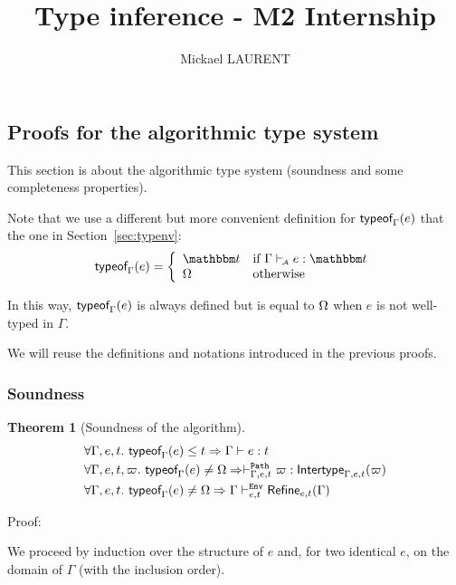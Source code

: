 \documentclass[a4paper]{article}
\title{\vspace{1.5cm}Type inference - M2 Internship}
\author{Mickael LAURENT}
\date{\vspace{-5ex}}
\theoremstyle{definition}
\newtheorem{theorem}{Theorem}
\begin{document}
  \maketitle

  \subsection{Proofs for the algorithmic type system}

  This section is about the algorithmic type system (soundness and some completeness properties).

  Note that we use a different but more convenient definition for $\textsf{typeof}_{\Gamma}(e)$ that the one
  in Section~\ref{sec:typenv}:
  \begin{align*}
    \tyof e \Gamma = 
    \left\{\begin{array}{ll}
      \ts & \text{if } \Gamma \vdashA e:\ts \\
      \tsempty & \text{otherwise}
    \end{array}\right.
  \end{align*}

  In this way, $\textsf{typeof}_{\Gamma}(e)$ is always defined but is equal to $\Omega$ when $e$ is not
  well-typed in $\Gamma$. 

  We will reuse the definitions and notations introduced in the previous proofs.

  \subsubsection{Soundness}

  \begin{theorem}[Soundness of the algorithm]
    \begin{align*}
      &\forall \Gamma, e, t.\ \textsf{typeof}_{\Gamma}(e) \leq t \Rightarrow \Gamma \vdash e:t\\
      &\forall \Gamma, e, t, \varpi.\ \textsf{typeof}_{\Gamma}(e) \neq \Omega \Rightarrow \vdash^{\texttt{Path}}_{\Gamma,e,t} \varpi:\textsf{Intertype}_{\Gamma,e,t} (\varpi)\\
      &\forall \Gamma, e, t.\ \textsf{typeof}_{\Gamma}(e) \neq \Omega \Rightarrow \Gamma \vdash^{\texttt{Env}}_{e,t} \textsf{Refine}_{e,t}(\Gamma)
    \end{align*}
  \end{theorem}

  Proof:

  We proceed by induction over the structure of $e$
  and, for two identical $e$, on the domain of $\Gamma$ (with the inclusion order).
\end{document}
